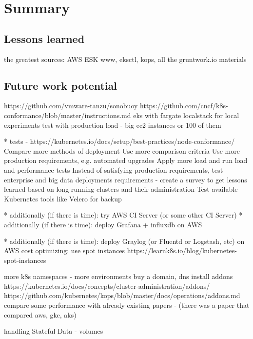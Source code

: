 \section{Summary}
\subsection{Lessons learned}

the greatest sources: AWS ESK www, eksctl, kops, all the gruntwork.io materials

\subsection{Future work potential}
https://github.com/vmware-tanzu/sonobuoy
https://github.com/cncf/k8s-conformance/blob/master/instructions.md
eks with fargate
localstack for local experiments
test with production load - big ec2 instances or 100 of them

* tests - https://kubernetes.io/docs/setup/best-practices/node-conformance/
Compare more methods of deployment
Use more comparison criteria
Use more production requirements, e.g. automated upgrades
Apply more load and run load and performance tests
Instead of satisfying production requirements, test enterprise and big data deployments requirements - create a survey to get lessons learned based on long running clusters and their administration
Test available Kubernetes tools like Velero for backup

* additionally (if there is time): try AWS CI Server (or some other CI Server)
* additionally (if there is time): deploy Grafana + influxdb on AWS

* additionally (if there is time): deploy Graylog (or Fluentd or Logstash, etc) on AWS
cost optimizing: use spot instances https://learnk8s.io/blog/kubernetes-spot-instances

more k8s namespaces - more environments
buy a domain, dns
install addons https://kubernetes.io/docs/concepts/cluster-administration/addons/ https://github.com/kubernetes/kops/blob/master/docs/operations/addons.md
compare some performance with already existing papers - (there was a paper that compared aws, gke, aks)

handling Stateful Data - volumes
